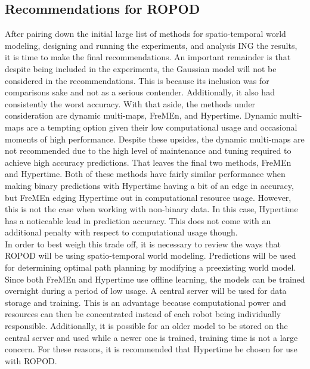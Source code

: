     \subsection{ Recommendations for ROPOD }

    After pairing down the initial large list of methods for spatio-temporal
    world modeling, designing and running the experiments, and analysis ING the
    results, it is time to make the final recommendations. An important remainder
    is that despite being included in the experiments, the Gaussian model will
    not be considered in the recommendations. This is because its inclusion was
    for comparisons sake and not as a serious contender. Additionally, it
    also had consistently the worst accuracy. With that aside, the methods
    under consideration are dynamic multi-maps, FreMEn, and Hypertime.
    Dynamic multi-maps are a tempting option given their low computational
    usage and occasional moments of high performance. Despite these upsides,
    the dynamic multi-maps are not recommended due to the high level of maintenance
    and tuning required to achieve high accuracy predictions. That leaves the
    final two methods, FreMEn and Hypertime. Both of these methods have fairly
    similar performance when making binary predictions with Hypertime having a
    bit of an edge in accuracy, but FreMEn edging Hypertime out in computational
    resource usage. However, this is not the case when working with non-binary
    data. In this case, Hypertime has a noticeable lead in prediction accuracy.
    This does not come with an additional penalty with respect to computational
    usage though. \\

    In order to best weigh this trade off, it is necessary to review the ways
    that ROPOD will be using spatio-temporal world modeling. Predictions will
    be used for determining optimal path planning by modifying a preexisting
    world model. Since both FreMEn and Hypertime use offline learning, the models
    can be trained overnight during a period of low usage. A central server
    will be used for data storage and training. This is an advantage because
    computational power and resources can then be concentrated instead of each
    robot being individually responsible. Additionally, it is
    possible for an older model to be stored on the central server and used
    while a newer one is trained, training time is not a large concern. For
    these reasons, it is recommended that Hypertime be chosen for use with
    ROPOD. \\

